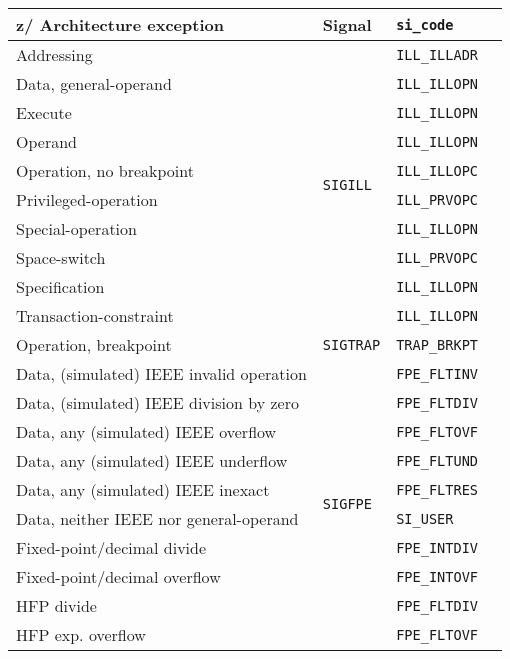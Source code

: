 \documentclass[english,11pt,twoside,toc=bib,toc=idx]{scrreprt}
\newcommand{\ARCH}{z/\kern-1pt Ar\-chi\-tec\-ture}
\newcommand{\ARCH}{ESA/390}
\newenvironment{DIFnomarkup}{}{} %
\begin{document}
\begin{table}
  \centering
  \begin{DIFnomarkup}
  \begin{threeparttable}
    \begin{tabular}{llll}
      \toprule
      \ARCH{} exception
      & Signal & \texttt{si\_code} \\
      \midrule
      Addressing & \multirow{10}{*}{\texttt{SIGILL}} & \texttt{ILL\_ILLADR} \\
      Data, general-operand & & \texttt{ILL\_ILLOPN} \\
      Execute & & \texttt{ILL\_ILLOPN} \\
      Operand & & \texttt{ILL\_ILLOPN} \\
      Operation, no breakpoint\tnote{\dagger} & & \texttt{ILL\_ILLOPC} \\
      Privileged-operation & & \texttt{ILL\_PRVOPC} \\
      Special-operation & & \texttt{ILL\_ILLOPN} \\
      Space-switch & & \texttt{ILL\_PRVOPC} \\
      Specification & & \texttt{ILL\_ILLOPN} \\
      Transaction-constraint & & \texttt{ILL\_ILLOPN} \\
      \midrule
      Operation, breakpoint\tnote{\dagger} & \texttt{SIGTRAP}
               & \texttt{TRAP\_BRKPT} \\
      \midrule
      Data, (simulated) IEEE invalid operation
      & \multirow{18}{*}{\texttt{SIGFPE}} & \texttt{FPE\_FLTINV} \\
      Data, (simulated) IEEE division by zero & & \texttt{FPE\_FLTDIV} \\
      Data, any (simulated) IEEE overflow & & \texttt{FPE\_FLTOVF} \\
      Data, any (simulated) IEEE underflow & & \texttt{FPE\_FLTUND} \\
      Data, any (simulated) IEEE inexact\tnote{\ddagger} &
               & \texttt{FPE\_FLTRES} \\
      Data, neither IEEE nor general-operand & & \texttt{SI\_USER} \\
      Fixed-point/decimal divide & & \texttt{FPE\_INTDIV} \\
      Fixed-point/decimal overflow & & \texttt{FPE\_INTOVF} \\
      HFP divide & & \texttt{FPE\_FLTDIV} \\
      HFP exp\@. overflow & & \texttt{FPE\_FLTOVF} \\

\end{tabular}
\end{threeparttable}
\end{DIFnomarkup}
\end{table}
\end{document}
